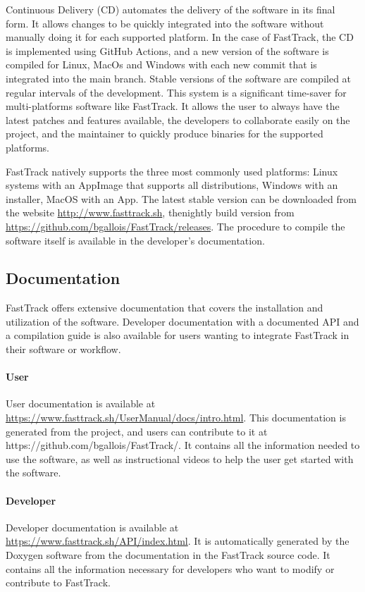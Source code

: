         Continuous Delivery (CD) automates the delivery of the software in its final form. It allows changes to be quickly integrated into the software without manually doing it for each supported platform. In the case of FastTrack, the CD is implemented using GitHub Actions, and a new version of the software is compiled for Linux, MacOs and Windows with each new commit that is integrated into the main branch. Stable versions of the software are compiled at regular intervals of the development. This system is a significant time-saver for multi-platforms software like FastTrack. It allows the user to always have the latest patches and features available, the developers to collaborate easily on the project, and the maintainer to quickly produce binaries for the supported platforms.

        FastTrack natively supports the three most commonly used platforms: Linux systems with an AppImage that supports all distributions, Windows with an installer, MacOS with an App. The latest stable version can be downloaded from the website \url{http://www.fasttrack.sh}, thenightly build version from \url{https://github.com/bgallois/FastTrack/releases}. The procedure to compile the software itself is available in the developer's documentation.

		\subsection{Documentation}
        FastTrack offers extensive documentation that covers the installation and utilization of the software. Developer documentation with a documented API and a compilation guide is also available for users wanting to integrate FastTrack in their software or workflow.
        \paragraph{User} User documentation is available at \url{https://www.fasttrack.sh/UserManual/docs/intro.html}. This documentation is generated from the project, and users can contribute to it at https://github.com/bgallois/FastTrack/. It contains all the information needed to use the software, as well as instructional videos to help the user get started with the software.
        \paragraph{Developer} Developer documentation is available at \url{https://www.fasttrack.sh/API/index.html}. It is automatically generated by the Doxygen software from the documentation in the FastTrack source code. It contains all the information necessary for developers who want to modify or contribute to FastTrack.

